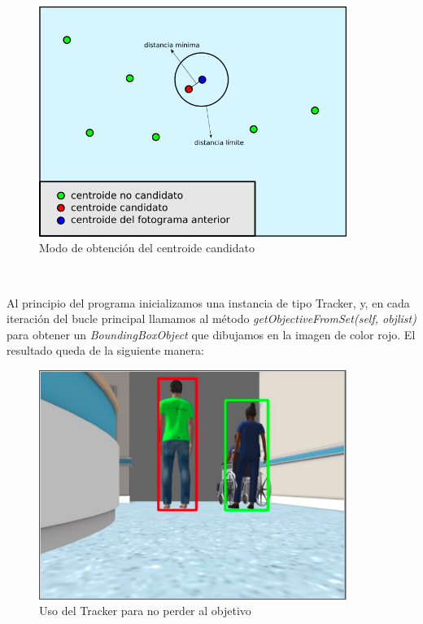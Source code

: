 \begin{figure} [H]
  \begin{center}
    \includegraphics[width=10cm]{imagenes/cap6/esquema-tracker.png}
  \end{center}
  \caption[Modo de obtención del centroide candidato]{Modo de obtención del centroide candidato}
  \label{fig:obtencion_centroide}
\end{figure}\

Al principio del programa inicializamos una instancia de tipo Tracker, y, en cada iteración del bucle principal llamamos al método \textit{getObjectiveFromSet(self, objlist)} para obtener un \textit{BoundingBoxObject} que dibujamos en la imagen de color rojo. El resultado queda de la siguiente manera:\\

\begin{figure} [H]
  \begin{center}
    \includegraphics[width=10cm]{imagenes/cap6/aplicando-tracker.png}
  \end{center}
  \caption[Usando el Tracker para no perder al objetivo]{Uso del Tracker para no perder al objetivo}
  \label{fig:uso_tracker}
\end{figure}\

